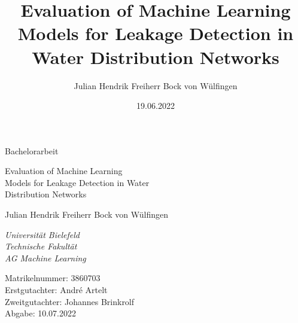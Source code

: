 \documentclass[twoside]{report}
\title{
    Evaluation of Machine Learning Models for Leakage Detection in Water Distribution Networks
}
\author{Julian Hendrik Freiherr Bock von Wülfingen}
\date{19.06.2022}
\begin{document}
\onehalfspacing

\begin{titlepage} %

	\begin{center}

        \vspace*{\baselineskip}

        {\Large Bachelorarbeit}
        
        \vspace{1.75\baselineskip}
        
        {\LARGE Evaluation of Machine Learning \\ Models for Leakage Detection in Water \\ Distribution Networks\par} %
    
        \vspace{5\baselineskip}
        
        {\Large Julian Hendrik Freiherr Bock von Wülfingen}
        
        \vspace{2\baselineskip}
        
        \textit{Universität Bielefeld \\ Technische Fakultät \\ AG Machine Learning}

    \end{center}
	
	\vfill %

	\vspace{0.3\baselineskip} %
	
	Matrikelnummer:	  3860703\\
    Erstgutachter:	  André Artelt\\
    Zweitgutachter:	  Johannes Brinkrolf\\
    Abgabe:		    10.07.2022

\end{titlepage}

\tableofcontents












\end{document}
